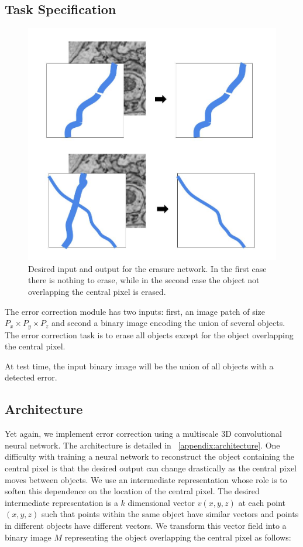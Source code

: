 \documentclass{article}
\begin{document}
\subsection{Task Specification}
\begin{figure}
\begin{center}
	\includegraphics[width=0.65\linewidth]{correction_task.jpg}
	\caption{Desired input and output for the erasure network. In the first case there is nothing to erase, while in the second case the object not overlapping the central pixel is erased.}
	\label{fig:error_correction_cartoon}
\end{center}
\end{figure}
The error correction module has two inputs: first, an image patch of size $P_x\times P_y\times P_z$ and second a binary image encoding the union of several objects. The error correction task is to erase all objects except for the object overlapping the central pixel.

At test time, the input binary image will be the union of all objects with a detected error.

\subsection{Architecture}
Yet again, we implement error correction using a multiscale 3D convolutional neural network. The architecture is detailed in ~\ref{appendix:architecture}. One difficulty with training a neural network to reconstruct the object containing the central pixel is that the desired output can change drastically as the central pixel moves between objects. We use an intermediate representation whose role is to soften this dependence on the location of the central pixel. The desired intermediate representation is a $k$ dimensional vector $v(x,y,z)$ at each point $(x,y,z)$ such that points within the same object have similar vectors and points in different objects have different vectors. We transform this vector field into a binary image $M$ representing the object overlapping the central pixel as follows:
\end{document}

